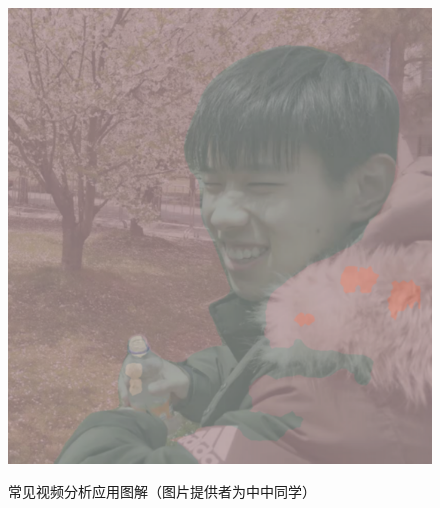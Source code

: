 \begin{figure}[hb!]
{\begin{minipage}[t]{0.28\linewidth}
    \includegraphics[width=\linewidth]{figures/seg.png}
    \end{minipage}\label{fig:seg}
    }
    \centering
    \caption{常见视频分析应用图解（图片提供者为中中同学）}\label{fig:cvexample}
    \centering
\end{figure}